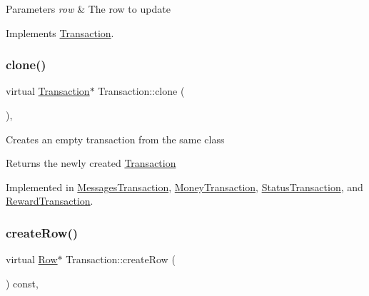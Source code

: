 \begin{DoxyParams}{Parameters}
{\em row} & The row to update \\
\hline
\end{DoxyParams}


Implements \mbox{\hyperlink{classTransaction_a1ef3b245f37c217f50f8f76fceebca4a}{Transaction}}.

\mbox{\label{classTransaction_ad6ee9c5e4067b2f5c950c6aad131b3e4}} 
\subsubsection{\texorpdfstring{clone()}{clone()}}
{\footnotesize\ttfamily virtual \mbox{\hyperlink{classTransaction}{Transaction}}$\ast$ Transaction\+::clone (\begin{DoxyParamCaption}{ }\end{DoxyParamCaption})\hspace{0.3cm}{\ttfamily [pure virtual]}, {\ttfamily [inherited]}}

Creates an empty transaction from the same class

\begin{DoxyReturn}{Returns}
the newly created \mbox{\hyperlink{classTransaction}{Transaction}} 
\end{DoxyReturn}


Implemented in \mbox{\hyperlink{classMessagesTransaction_a290e38ea445bba3f62956c660607c03f}{Messages\+Transaction}}, \mbox{\hyperlink{classMoneyTransaction_af777b46f577df3c089a44c78c1aebc40}{Money\+Transaction}}, \mbox{\hyperlink{classStatusTransaction_ac920c5dfe6f75a650e74b92899310400}{Status\+Transaction}}, and \mbox{\hyperlink{classRewardTransaction_a414728d857fcf05295a7f3f4fa024dc1}{Reward\+Transaction}}.

\mbox{\label{classTransaction_aa80b621537fe480dcb4444bba703abe5}} 
\subsubsection{\texorpdfstring{create\+Row()}{createRow()}}
{\footnotesize\ttfamily virtual \mbox{\hyperlink{classRow}{Row}}$\ast$ Transaction\+::create\+Row (\begin{DoxyParamCaption}{ }\end{DoxyParamCaption}) const\hspace{0.3cm}{\ttfamily [pure virtual]}, {\ttfamily [inherited]}}

